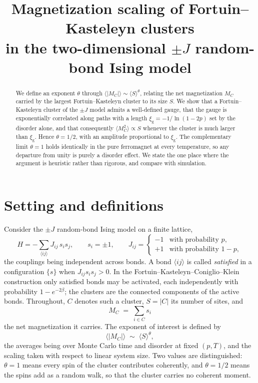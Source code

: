 \documentclass[11pt]{article}
\title{Magnetization scaling of Fortuin--Kasteleyn clusters\\
in the two-dimensional $\pm J$ random-bond Ising model}
\author{}
\date{}
\theoremstyle{remark}
\newcommand{\Mc}{M_{C}}
\newcommand{\xig}{\xi_{\mathrm{g}}}
\begin{document}
\maketitle
\vspace{-2.5\baselineskip}

\begin{abstract}
\noindent
We define an exponent $\theta$ through $\langle |\Mc| \rangle \sim \langle S \rangle^{\theta}$,
relating the net magnetization $\Mc$ carried by the largest Fortuin--Kasteleyn cluster to
its size $S$. We show that a Fortuin--Kasteleyn cluster of the $\pm J$ model admits a
well-defined gauge, that the gauge is exponentially correlated along paths with a length
$\xig = -1/\ln(1-2p)$ set by the disorder alone, and that consequently
$\langle \Mc^{2}\rangle \propto S$ whenever the cluster is much larger than $\xig$. Hence
$\theta = 1/2$, with an amplitude proportional to $\xig$. The complementary limit
$\theta = 1$ holds identically in the pure ferromagnet at every temperature, so any
departure from unity is purely a disorder effect. We state the one place where the
argument is heuristic rather than rigorous, and compare with simulation.
\end{abstract}

\section{Setting and definitions}

Consider the $\pm J$ random-bond Ising model on a finite lattice,
\begin{equation}
  H = -\sum_{\langle ij\rangle} J_{ij}\, s_i s_j,
  \qquad s_i = \pm 1,
  \qquad
  J_{ij} =
  \begin{cases}
    -1 & \text{with probability } p,\\
    +1 & \text{with probability } 1-p,
  \end{cases}
\end{equation}
the couplings being independent across bonds. A bond $\langle ij\rangle$ is called
\emph{satisfied} in a configuration $\{s\}$ when $J_{ij}s_is_j > 0$. In the
Fortuin--Kasteleyn--Coniglio--Klein construction only satisfied bonds may be activated,
each independently with probability $1-e^{-2\beta}$; the clusters are the connected
components of the active bonds. Throughout, $C$ denotes such a cluster, $S = |C|$ its
number of sites, and
\begin{equation}
  \Mc \;=\; \sum_{i \in C} s_i
\end{equation}
the net magnetization it carries. The exponent of interest is defined by
\begin{equation}
  \bigl\langle |\Mc| \bigr\rangle \;\sim\; \bigl\langle S \bigr\rangle^{\theta},
  \label{eq:theta-def}
\end{equation}
the averages being over Monte Carlo time and disorder at fixed $(p,T)$, and the scaling
taken with respect to linear system size. Two values are distinguished: $\theta = 1$ means
every spin of the cluster contributes coherently, and $\theta = 1/2$ means the spins add
as a random walk, so that the cluster carries no coherent moment.
\end{document}
